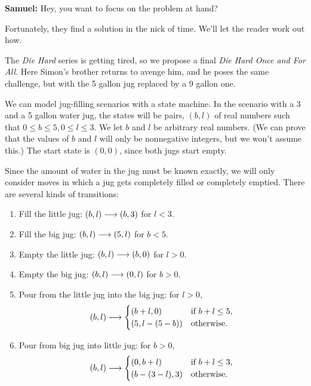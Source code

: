 \begin{example}
{\begin{list}{}{\itemsep=0in \leftmargin=0.25in \rightmargin=0.25in}
\item[\textbf{Samuel:}] Hey, you want to focus on the problem at hand?

\end{list}
}

Fortunately, they find a solution in the nick of time.  We'll let the
reader work out how.

The \emph{Die Hard} series is getting tired, so we propose a final
\emph{Die Hard Once and For All}.  Here Simon's brother returns to avenge
him, and he poses the same challenge, but with the 5 gallon jug replaced
by a 9 gallon one.

We can model jug-filling scenarios with a state machine.  In the scenario
with a 3 and a 5 gallon water jug, the states will be pairs, $(b,l)$ of
real numbers such that $0 \leq b \leq 5, 0 \leq l \leq 3$.  We let $b$ and
$l$ be arbitrary real numbers.  (We can prove that the values of $b$ and
$l$ will only be nonnegative integers, but we won't assume this.)  The
start state is $(0,0)$, since both jugs start empty.

Since the amount of water in the jug must be known exactly, we will only
consider moves in which a jug gets completely filled or completely
emptied.  There are several kinds of transitions:
\begin{enumerate}

\item  Fill the little jug: $(b,l) \mathrel{\longrightarrow} (b,3)$ for $l < 3$.

\item  Fill the big jug: $(b,l) \mathrel{\longrightarrow} (5,l)$ for $b<5$.

\item  Empty the little jug: $(b,l) \mathrel{\longrightarrow} (b,0)$ for $l>0$.

\item  Empty the big jug: $(b,l) \mathrel{\longrightarrow} (0,l)$ for $b>0$.

\item  Pour from the little jug into the big jug: for $l>0$,
\begin{equation*}
(b,l) \mathrel{\longrightarrow}
\begin{cases}
(b+l, 0) & \text{if $b + l \le 5$,}\\
(5, l - (5 - b)) & \text{otherwise.}
\end{cases}
\end{equation*}

\item Pour from big jug into little jug: for $b>0$,
\begin{equation*}
(b,l) \mathrel{\longrightarrow}
\begin{cases}
(0, b+l) & \text{if $b + l \le 3$,}\\
(b - (3 -l), 3) & \text{otherwise.}
\end{cases}
\end{equation*}
\end{enumerate}



\end{example}
